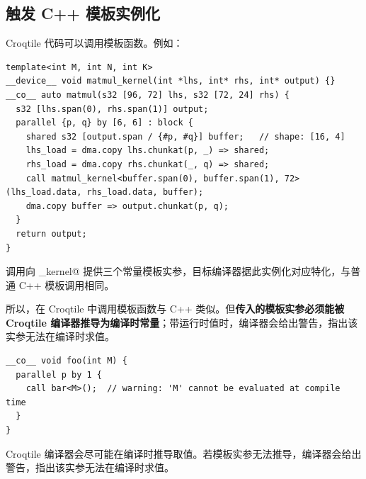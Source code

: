 \subsection*{触发 C++ 模板实例化}

Croqtile 代码可以调用模板函数。例如：

\begin{lstlisting}[language=croqtile,caption={一个模板化的设备辅助函数}]
template<int M, int N, int K>
__device__ void matmul_kernel(int *lhs, int* rhs, int* output) {}
__co__ auto matmul(s32 [96, 72] lhs, s32 [72, 24] rhs) {
  s32 [lhs.span(0), rhs.span(1)] output;
  parallel {p, q} by [6, 6] : block {
    shared s32 [output.span / {#p, #q}] buffer;   // shape: [16, 4]
    lhs_load = dma.copy lhs.chunkat(p, _) => shared;
    rhs_load = dma.copy rhs.chunkat(_, q) => shared;
    call matmul_kernel<buffer.span(0), buffer.span(1), 72>(lhs_load.data, rhs_load.data, buffer);
    dma.copy buffer => output.chunkat(p, q);
  }
  return output;
}
\end{lstlisting}

调用向 \co@matmul_kernel@ 提供三个常量模板实参，目标编译器据此实例化对应特化，与普通 C++ 模板调用相同。

所以，在 Croqtile 中调用模板函数与 C++ 类似。但\textbf{传入的模板实参必须能被 Croqtile 编译器推导为编译时常量}；带运行时值时，编译器会给出警告，指出该实参无法在编译时求值。

\begin{lstlisting}[language=croqtile,caption={一次触发实例化的调用}]
__co__ void foo(int M) {
  parallel p by 1 {
    call bar<M>();  // warning: 'M' cannot be evaluated at compile time
  }
}
\end{lstlisting}

Croqtile 编译器会尽可能在编译时推导取值。若模板实参无法推导，编译器会给出警告，指出该实参无法在编译时求值。

